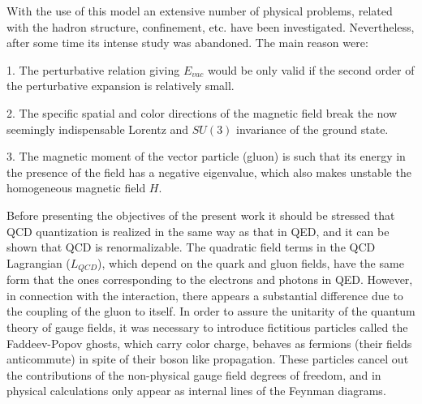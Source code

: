\documentclass[12pt,letterpaper]{report}
\begin{document}
With the use of this model an extensive number of physical
problems, related with the hadron structure, confinement, etc.
have been investigated. Nevertheless, after some time its intense
study was abandoned. The main reason were:

1. The perturbative relation giving $E_{vac}$ would be only valid
if the second order of the perturbative expansion is relatively
small.

2. The specific spatial and color directions of the magnetic field
break the now seemingly indispensable Lorentz and $SU(3)$
invariance of the ground state.

3. The magnetic moment of the vector particle (gluon) is such that
its energy in the presence of the field has a negative eigenvalue,
which also makes unstable the homogeneous magnetic field $H$.

Before presenting the objectives of the present work it should be
stressed that QCD quantization \cite{Faddeev-Popov} is realized in
the same way as that in QED, and it can be shown that QCD is
renormalizable. The quadratic field terms in the QCD Lagrangian
($L_{QCD}$), which depend on the quark and gluon fields, have the
same form that the ones corresponding to the electrons and photons
in QED. However, in connection with the interaction, there appears
a substantial difference due to the coupling of the gluon to
itself. In order to assure the unitarity of the quantum theory of
gauge fields, it was necessary to introduce fictitious particles
called the Faddeev-Popov ghosts, which carry color charge, behaves
as fermions (their fields anticommute) in spite of their boson
like propagation. These particles cancel out the contributions of
the non-physical gauge field degrees of freedom, and in physical
calculations only appear as internal lines of the Feynman
diagrams.
\end{document}
